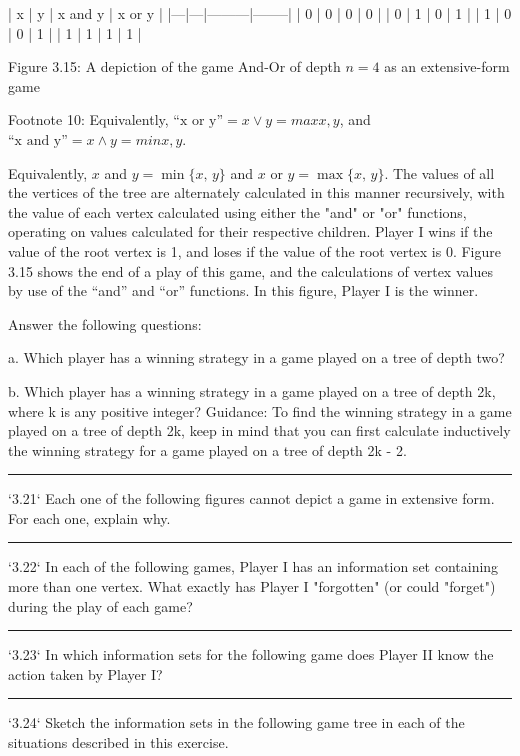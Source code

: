 \documentclass[10pt]{report}
\begin{document}
		| x | y | x and y | x or y |
		|---|---|---------|--------|
		| 0 | 0 | 0       | 0      |
		| 0 | 1 | 0       | 1      |
		| 1 | 0 | 0       | 1      |
		| 1 | 1 | 1       | 1      |

		Figure 3.15: A depiction of the game And-Or of depth $n=4$ as an extensive-form game

		Footnote 10: Equivalently, $\text{“x or y”} = x \vee y = max{x, y}$, and $\text{“x and y”} = x \wedge y = min{x, y}$.

		Equivalently, $x$ and $y=\min\{x,\,y\}$ and $x$ or $y=\max\{x,\,y\}$. The values of all the vertices of the tree are alternately calculated in this manner recursively, with the value of each vertex calculated using either the "and" or "or" functions, operating on values calculated for their respective children. Player I wins if the value of the root vertex is 1, and loses if the value of the root vertex is 0. Figure 3.15 shows the end of a play of this game, and the calculations of vertex values by use of the “and” and “or” functions. In this figure, Player I is the winner.

		Answer the following questions:

		a. Which player has a winning strategy in a game played on a tree of depth two?

		b. Which player has a winning strategy in a game played on a tree of depth 2k, where k is any positive integer? Guidance: To find the winning strategy in a game played on a tree of depth 2k, keep in mind that you can first calculate inductively the winning strategy for a game played on a tree of depth 2k - 2.

		\vspace{0.5cm}
		\hrule
		\vspace{0.5cm}
		`3.21` Each one of the following figures cannot depict a game in extensive form. For each
		one, explain why.

		\vspace{0.5cm}
		\hrule
		\vspace{0.5cm}
		`3.22` In each of the following games, Player I has an information set containing more than one vertex. What exactly has Player I "forgotten" (or could "forget") during the play of each game?

		\vspace{0.5cm}
		\hrule
		\vspace{0.5cm}
		`3.23` In which information sets for the following game does Player II know the action taken by Player I?

		\vspace{0.5cm}
		\hrule
		\vspace{0.5cm}
		`3.24` Sketch the information sets in the following game tree in each of the situations described in this exercise.
\end{document}
